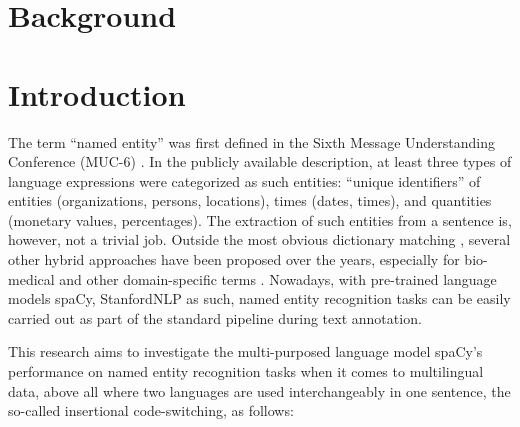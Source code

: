 \documentclass[11pt]{article}
\begin{document}
\section{Background}

















































\newpage

\section{Introduction}

The term ``named entity'' was first defined in the Sixth Message Understanding Conference (MUC-6) \citep{grishman1996ner}. In the publicly available description, at least three types of language expressions were categorized as such entities: ``unique identifiers'' of entities (organizations, persons, locations), times (dates, times), and quantities (monetary values, percentages). The extraction of such entities from a sentence is, however, not a trivial job. Outside the most obvious dictionary matching \citep{higashinaka2012nerwiki,shang2018learning}, several other hybrid approaches have been proposed over the years, especially for bio-medical and other domain-specific terms \citep{rock2012nerbio,lou2020dicthyb}. Nowadays, with pre-trained language models spaCy, StanfordNLP as such, named entity recognition tasks can be easily carried out as part of the standard pipeline during text annotation.

This research aims to investigate the multi-purposed language model spaCy's performance on named entity recognition tasks when it comes to multilingual data, above all where two languages are used interchangeably in one sentence, the so-called insertional code-switching, as follows:
\end{document}
